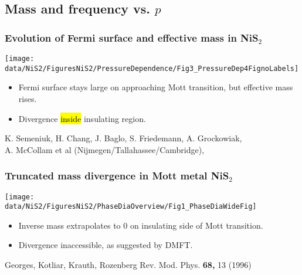 \subsection{Mass and frequency vs. $p$}
\begin{frame}[label=QONiS2]
\frametitle{Evolution of Fermi surface and effective mass in NiS$_2$}
\vspace{0.5em}

\centerline{\texttt{[image: \\data/NiS2/FiguresNiS2/PressureDependence/Fig3\_PressureDep4FignoLabels]}}
\begin{itemize}
\item
Fermi surface stays large on approaching Mott transition, but
effective mass rises.
\item
Divergence \hl{inside} insulating region.
\end{itemize}

\vspace*{\fill}
\centerline{\makebox[\linewidth]{\rule{0.85\textwidth}{0.4pt}}}
\begin{center}
{\scriptsize K. Semeniuk, H. Chang, J. Baglo, S. Friedemann, A. Grockowiak, \\
A. McCollam et al (Nijmegen/Tallahassee/Cambridge),  }
\end{center}

\end{frame}


\begin{frame}[label=QONiS2-2]
  \frametitle{Truncated mass divergence in Mott metal NiS$_2$}
  
  \centerline{\texttt{[image: \\data/NiS2/FiguresNiS2/PhaseDiaOverview/Fig1\_PhaseDiaWideFig]}}
  \begin{itemize}
  \item<1->
  Inverse mass extrapolates to 0 on insulating side of Mott
  transition.
  \item<visible@2->
  Divergence inaccessible, as suggested by DMFT.
  
  \end{itemize}
  
  \vspace*{\fill}
  \vspace{-0.25em}
  \centerline{\makebox[\linewidth]{\rule{0.85\textwidth}{0.4pt}}}
  \centerline{\scriptsize Georges, Kotliar, Krauth, Rozenberg
    Rev. Mod. Phys. {\bf 68,} 13 (1996)}
  \end{frame}
  
  